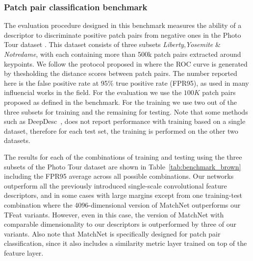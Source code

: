 \subsubsection{Patch pair classification benchmark}
\label{sec:patch_classification}
The evaluation procedure designed in this benchmark measures the ability of
a descriptor to discriminate positive patch pairs from negative ones in
the Photo Tour dataset \cite{BHW10}. This dataset consists of three
subsets {\em Liberty},{\em Yosemite} \& {\em Notredame}, with each
containing more than 500k patch pairs extracted around  keypoints.  We follow the protocol proposed in \cite{BHW10} where the ROC curve is generated by thesholding the distance scores between patch pairs. The number reported here is the false positive rate at 95\% true positive rate (FPR95), as used in many influencial works in the field. For the evaluation we use the $100K$ patch pairs proposed as defined in the benchmark. For the training we use two out of the three subsets for training and the remaining for testing.  Note that some methods such as 
DeepDesc~\cite{simo2015deepdesc}, does not report performance with training based on a single dataset, therefore for each test set, the training is performed on the other two datasets.

The results for each of the combinations of training and testing using
the three subsets of the Photo Tour dataset are shown in
Table~\ref{tab:benchmark_brown} including the FPR95 average across all possible
combinations. Our networks outperform all
the previously introduced single-scale convolutional feature
descriptors, and in some cases with large margins except from one
training-test combination where the 4096-dimensional version of
MatchNet outperforms our TFeat variants. However, even in this
case, the version of MatchNet with comparable dimensionality to our
descriptors is outperformed by three of our variants. Also note that
MatchNet is specifically designed for patch pair classification,
since it also includes a similarity metric layer  trained on top of the feature layer.


